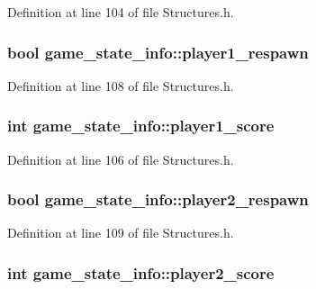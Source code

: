 Definition at line 104 of file Structures.\-h.

\hypertarget{structgame__state__info_a6ece578c6ce78f5f2d71b55f1678bb22}{
\subsubsection[{player1\-\_\-respawn}]{\setlength{\rightskip}{0pt plus 5cm}bool game\-\_\-state\-\_\-info\-::player1\-\_\-respawn}}\label{structgame__state__info_a6ece578c6ce78f5f2d71b55f1678bb22}


Definition at line 108 of file Structures.\-h.

\hypertarget{structgame__state__info_ad1d0950a104fa3def5a1f259a3c0914c}{
\subsubsection[{player1\-\_\-score}]{\setlength{\rightskip}{0pt plus 5cm}int game\-\_\-state\-\_\-info\-::player1\-\_\-score}}\label{structgame__state__info_ad1d0950a104fa3def5a1f259a3c0914c}


Definition at line 106 of file Structures.\-h.

\hypertarget{structgame__state__info_ac2783a12bd611e0873284e0c4dd5fcf4}{
\subsubsection[{player2\-\_\-respawn}]{\setlength{\rightskip}{0pt plus 5cm}bool game\-\_\-state\-\_\-info\-::player2\-\_\-respawn}}\label{structgame__state__info_ac2783a12bd611e0873284e0c4dd5fcf4}


Definition at line 109 of file Structures.\-h.

\hypertarget{structgame__state__info_a16292b25dcb66803f6eeecf8779c5edd}{
\subsubsection[{player2\-\_\-score}]{\setlength{\rightskip}{0pt plus 5cm}int game\-\_\-state\-\_\-info\-::player2\-\_\-score}}\label{structgame__state__info_a16292b25dcb66803f6eeecf8779c5edd}


